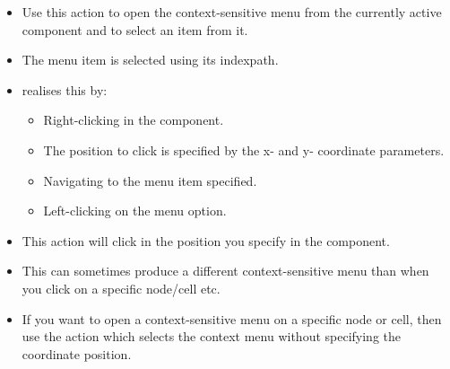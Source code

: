 \begin{itemize}
\item Use this action to open the context-sensitive menu from the currently active component and to select an item from it.
\item The menu item is selected using its indexpath. 
\item \jb{} realises this by:
\begin{itemize}
\item Right-clicking in the component.
\item The position to click is specified by the x- and y- coordinate parameters.
\item Navigating to the menu item specified.
\item Left-clicking on the menu option.  
\end{itemize}
\item This action will click in the position you specify in the component.
\item This can sometimes produce a different context-sensitive menu than when you click on a specific node/cell etc.
\item If you want to open a context-sensitive menu on a specific node or cell, then use the action which selects the context menu without specifying the coordinate position.

\end{itemize}

